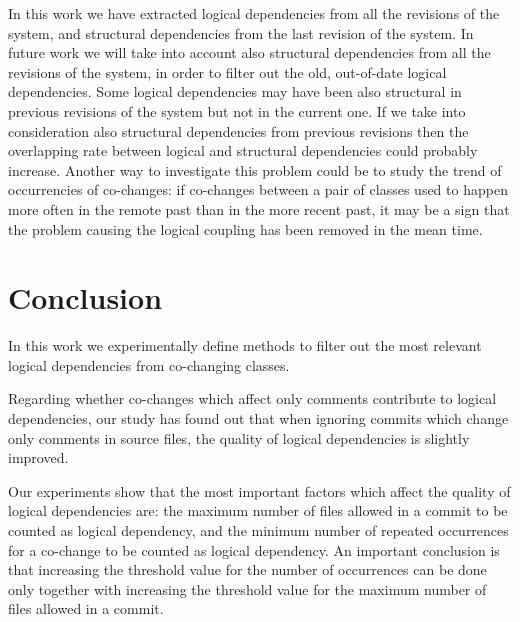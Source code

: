 \documentclass[a4paper,twoside]{article}
\begin{document}
In this work we have extracted logical dependencies from all the revisions of the system, and structural dependencies from the last revision of the system. In future work we will take into account also structural dependencies from all the revisions of the system, in order to filter out the old, out-of-date logical dependencies.  Some logical dependencies may have been also structural in previous revisions of the system but not in the current one. If we take into consideration also structural dependencies from previous revisions then the overlapping rate between logical and structural dependencies could probably increase. Another way to investigate this problem could be to study the trend of occurrencies of co-changes: if co-changes between a pair of classes used to happen more often in the remote past than in the more recent past, it may be a sign that the problem causing the logical coupling has been removed in the mean time. 


   


\section{Conclusion}
\label{sec:Conclusion}
   
In this work we experimentally define methods to filter out the most relevant logical dependencies from co-changing classes. 

Regarding whether co-changes which affect only comments contribute to logical dependencies, our study has found out that when ignoring commits which change only comments in source files, the quality of logical dependencies is slightly improved.

Our experiments show that the most important factors which affect the quality of logical dependencies are: the maximum number of files allowed in a commit to be counted as logical dependency, and the minimum number of repeated occurrences for a co-change to be counted as logical dependency. An important conclusion is that increasing the threshold value for the number of occurrences can be done only together with increasing the threshold value for the maximum number of files allowed in a commit.

 

{\small
}
 
\end{document}
